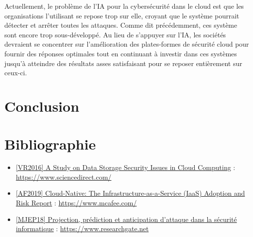 \documentclass[a4paper, 12pt]{article}
\begin{document}
      Actuellement, le problème de l’IA pour la cybersécurité dans le cloud est
      que les organisations l’utilisant se repose trop sur elle, croyant que le
      système pourrait détecter et arrêter toutes les attaques. Comme dit
      précédemment, ces système sont encore trop sous-développé. Au lieu de
      s'appuyer sur l’IA, les sociétés devraient se concentrer sur
      l'amélioration des plates-formes de sécurité cloud pour fournir des
      réponses optimales tout en continuant à investir dans ces systèmes jusqu’à
      atteindre des résultats asses satisfaisant pour se reposer entièrement sur
      ceux-ci.

  \section{Conclusion}

  \section{Bibliographie}
    \begin{itemize}
      \item \href{https://www.sciencedirect.com/science/article/pii/S1877050916315812}{[VR2016] A Study on Data Storage Security Issues in Cloud Computing} : \url{https://www.sciencedirect.com/}
      \item \href{https://www.mcafee.com/enterprise/en-us/assets/reports/restricted/rp-cloud-adoption-risk-report-iaas.pdf}{[AF2019] Cloud-Native: The Infrastructure-as-a-Service (IaaS) Adoption and Risk Report} : \url{https://www.mcafee.com/}
      \item \href{https://www.researchgate.net/publication/327449459_Survey_of_Attack_Projection_Prediction_and_Forecasting_in_Cyber_Security}{[MJEP18] Projection, prédiction et anticipation d'attaque dans la sécurité informatique} : \url{https://www.researchgate.net}
    \end{itemize}
\end{document}
